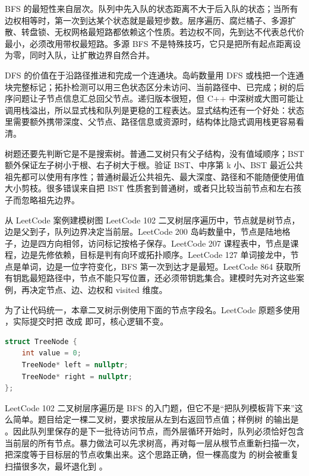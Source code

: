 BFS 的最短性来自层次。队列中先入队的状态距离不大于后入队的状态；当所有边权相等时，第一次到达某个状态就是最短步数。层序遍历、腐烂橘子、多源扩散、转盘锁、无权网格最短路都依赖这个性质。若边权不同，先到达不代表总代价最小，必须改用带权最短路。多源 BFS 不是特殊技巧，它只是把所有起点距离设为零，同时入队，让扩散边界自然合并。

DFS 的价值在于沿路径推进和完成一个连通块。岛屿数量用 DFS 或栈把一个连通块完整标记；拓扑检测可以用三色状态区分未访问、当前路径中、已完成；树的后序问题让子节点信息汇总回父节点。递归版本很短，但 C++ 中深树或大图可能让调用栈溢出，所以显式栈和队列是更稳的工程表达。显式结构还有一个好处：状态里需要额外携带深度、父节点、路径信息或资源时，结构体比隐式调用栈更容易看清。

树题还要先判断它是不是搜索树。普通二叉树只有父子结构，没有值域顺序；BST 额外保证左子树小于根、右子树大于根。验证 BST、中序第 k 小、BST 最近公共祖先都可以使用有序性；普通树最近公共祖先、最大深度、路径和不能随便使用值大小剪枝。很多错误来自把 BST 性质套到普通树，或者只比较当前节点和左右孩子而忽略祖先边界。

\begin{principlebox}{从 LeetCode 案例建模树图}
LeetCode 102 二叉树层序遍历中，节点就是树节点，边是父到子，队列边界决定当前层。LeetCode 200 岛屿数量中，节点是陆地格子，边是四方向相邻，访问标记按格子保存。LeetCode 207 课程表中，节点是课程，边是先修依赖，目标是判有向环或拓扑顺序。LeetCode 127 单词接龙中，节点是单词，边是一位字符变化，BFS 第一次到达才是最短。LeetCode 864 获取所有钥匙最短路径中，节点不能只写位置，还必须带钥匙集合。建模时先对齐这些案例，再决定节点、边、边权和 visited 维度。
\end{principlebox}

为了让代码统一，本章二叉树示例使用下面的节点字段名。LeetCode 原题多使用 ，实际提交时把  改成  即可，核心逻辑不变。

\begin{lstlisting}[language=C++,caption={二叉树节点示意}]
struct TreeNode {
    int value = 0;
    TreeNode* left = nullptr;
    TreeNode* right = nullptr;
};
\end{lstlisting}

LeetCode 102 二叉树层序遍历是 BFS 的入门题，但它不是“把队列模板背下来”这么简单。题目给定一棵二叉树，要求按层从左到右返回节点值；样例树  的输出是 \code{[[3],[9,20],[15,7]]}。因此队列里保存的是下一批待访问节点，而外层循环开始时，队列必须恰好包含当前层的所有节点。暴力做法可以先求树高，再对每一层从根节点重新扫描一次，把深度等于目标层的节点收集出来。这个思路正确，但一棵高度为  的树会被重复扫描很多次，最坏退化到 。

